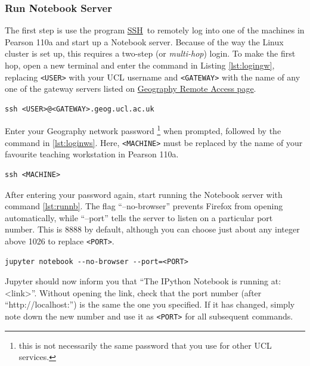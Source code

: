 \documentclass[a4paper]{article}
\begin{document}
\subsubsection{Run Notebook Server}
\label{sec:runnb}

The first step is use the program \href{http://linuxcommand.org/man_pages/ssh1.html}{SSH}~to remotely log into one of the machines in Pearson 110a and start up a Notebook server.
Because of the way the Linux cluster is set up, this requires a two-step (or \emph{multi-hop}) login.
To make the first hop, open a new terminal and enter the command in Listing \ref{lst:logingw}, replacing \texttt{\textless{}USER\textgreater{}} with your UCL username and \texttt{\textless{}GATEWAY\textgreater{}} with the name of any one of the gateway servers listed on \href{http://www.geog.ucl.ac.uk/resources/computer-support/linux-remote-access}{Geography Remote Access page}.

\begin{lstlisting}[caption={Login to gateway}, label={lst:logingw}]
ssh <USER>@<GATEWAY>.geog.ucl.ac.uk
\end{lstlisting}

Enter your Geography network password \footnote{this is not necessarily the same password that you use for other UCL services.} when prompted, followed by the command in \ref{lst:loginws}.
Here, \texttt{\textless{}MACHINE\textgreater{}} must be replaced by the name of your favourite teaching workstation in Pearson 110a.

\begin{lstlisting}[caption={Login to workstation}, label={lst:loginws}]
ssh <MACHINE>
\end{lstlisting}

After entering your password again, start running the Notebook server with command \ref{lst:runnb}.
The flag ``--no-browser'' prevents Firefox from opening automatically, while ``--port'' tells the server to listen on a particular port number.
This is 8888 by default, although you can choose just about any integer above 1026 to replace \texttt{\textless{}PORT\textgreater{}}.

\begin{lstlisting}[caption={Run Notebook server}, label={lst:runnb}]
jupyter notebook --no-browser --port=<PORT>
\end{lstlisting}

Jupyter should now inform you that ``The IPython Notebook is running at: \textless{}link\textgreater{}''.
Without opening the link, check that the port number (after ``http://localhost:'') is the same the one you specified.
If it has changed, simply note down the new number and use it as \texttt{\textless{}PORT\textgreater{}} for all subsequent commands.
\end{document}

